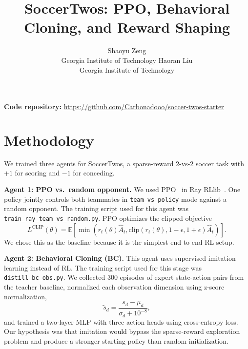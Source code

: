 \documentclass{article}
\title{SoccerTwos: PPO, Behavioral Cloning, and Reward Shaping}
\author{
  Shaoyu Zeng\\
  Georgia Institute of Technology
  \And
  Haoran Liu\\
  Georgia Institute of Technology
}
\begin{document}
\maketitle

\noindent\textbf{Code repository:}
\url{https://github.com/Carbonadooo/soccer-twos-starter}

\section{Methodology}

We trained three agents for SoccerTwos, a sparse-reward 2-vs-2 soccer task with
$+1$ for scoring and $-1$ for conceding.

\textbf{Agent 1: PPO vs.\ random opponent.}
We used PPO~\citep{schulman2017proximal} in Ray RLlib~\citep{liang2018rllib}.
One policy jointly controls both teammates in \texttt{team\_vs\_policy} mode
against a random opponent.
The training script used for this agent was
\texttt{train\_ray\_team\_vs\_random.py}.
PPO optimizes the clipped objective
\[
L^{\text{CLIP}}(\theta)=
\mathbb{E}\left[\min(r_t(\theta)\hat A_t,
\text{clip}(r_t(\theta),1-\epsilon,1+\epsilon)\hat A_t)\right].
\]
We chose this as the baseline because it is the simplest end-to-end RL setup.

\textbf{Agent 2: Behavioral Cloning (BC).}
This agent uses supervised imitation learning instead of RL.
The training script used for this stage was \texttt{distill\_bc\_obs.py}.
We collected 300 episodes of expert state-action pairs from the teacher baseline,
normalized each observation dimension using z-score normalization,
\[
\tilde s_d=\frac{s_d-\mu_d}{\sigma_d+10^{-8}},
\]
and trained a two-layer MLP with three action heads using cross-entropy loss.
Our hypothesis was that imitation would bypass the sparse-reward exploration
problem and produce a stronger starting policy than random initialization.
\end{document}
